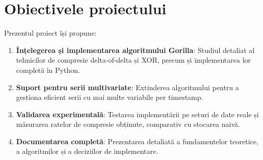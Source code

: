 \section{Obiectivele proiectului}

Prezentul proiect își propune:

\begin{enumerate}
    \item \textbf{Înțelegerea și implementarea algoritmului Gorilla}: Studiul detaliat al tehnicilor de compresie delta-of-delta și XOR, precum și implementarea lor completă în Python.

    \item \textbf{Suport pentru serii multivariate}: Extinderea algoritmului pentru a gestiona eficient serii cu mai multe variabile per timestamp.

    \item \textbf{Validarea experimentală}: Testarea implementării pe seturi de date reale și măsurarea ratelor de compresie obținute, comparativ cu stocarea naivă.

    \item \textbf{Documentarea completă}: Prezentarea detaliată a fundamentelor teoretice, a algoritmilor și a deciziilor de implementare.
\end{enumerate}